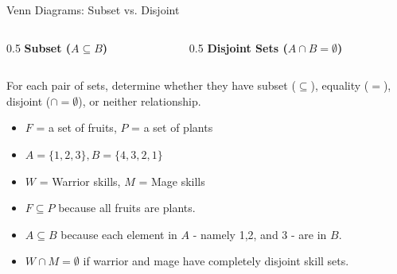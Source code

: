 \begin{frame}{Venn Diagrams: Subset vs. Disjoint}
\begin{columns}
\begin{column}{0.5\textwidth}
\centering
\textbf{Subset ($A \subseteq B$)}\\
\vspace{0.2cm}
\end{column}
\begin{column}{0.5\textwidth}
\centering
\textbf{Disjoint Sets ($A \cap B = \emptyset$)}\\
\vspace{0.2cm}
\end{column}
\end{columns}
\end{frame}

\begin{frame}[t]
\begin{ex}
For each pair of sets, determine whether they have subset ($\subseteq$), equality ($=$), disjoint ($\cap = \emptyset$), or neither relationship.
\begin{itemize}
\item $F$ = a set of fruits, $P$ = a set of plants
\item $A = \{1,2,3\}, B = \{4,3,2,1\}$
\item $W$ = Warrior skills, $M$ = Mage skills
\end{itemize}
\end{ex}
\begin{sol}
\begin{itemize}
\item $F \subseteq P$ because all fruits are plants.
\item $A \subseteq B$ because each element in $A$ - namely 1,2, and 3 - are in $B$.
\item $W \cap M = \emptyset$ if warrior and mage have completely disjoint skill sets.
\end{itemize}
\end{sol}
\end{frame}

